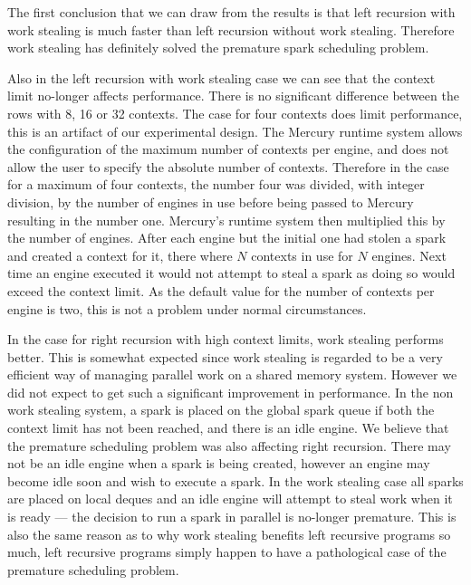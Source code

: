 The first conclusion that we can draw from the results is that
left recursion with work stealing is much faster than left recursion without
work stealing.
Therefore work stealing has definitely solved the premature spark scheduling
problem.

Also in the left recursion with work stealing case we can see that the
context limit no-longer affects performance.
There is no significant difference between the rows with 8, 16 or 32
contexts.
The case for four contexts does limit performance,
this is an artifact of our experimental design.
The Mercury runtime system allows the configuration of the maximum
number of contexts per engine, and does not allow the user to specify the
absolute number of contexts.
Therefore in the case for a maximum of four contexts, the number four was
divided,
with integer division,
by the number of engines in use before being passed to Mercury resulting in
the number one.
Mercury's runtime system then multiplied this by the number of engines.
After each engine but the initial one had stolen a spark and created a
context for it, there where $N$ contexts in use for $N$ engines.
Next time an engine executed \getglobalwork it would not attempt to steal a
spark as doing so would exceed the context limit.
As the default value for the number of contexts per engine is two,
this is not a problem under normal circumstances.

In the case for right recursion with high context limits, work stealing
performs better.
This is somewhat expected since work stealing is regarded to be a very
efficient way of managing parallel work on a shared memory system.
However we did not expect to get such a significant improvement in
performance.
In the non work stealing system, a spark is placed on the global spark queue
if both the context limit has not been reached, and there is an idle engine.
We believe that the premature scheduling problem was also affecting right
recursion.
There may not be an idle engine when a spark is being created,
however an engine may become idle soon and wish to execute a spark.
In the work stealing case all sparks are placed on local deques and an idle
engine will attempt to steal work when it is ready ---
the decision to run a spark in parallel is no-longer premature.
This is also the same reason as to why work stealing benefits left
recursive programs so much,
left recursive programs simply happen to have a pathological case of
the premature scheduling problem.

